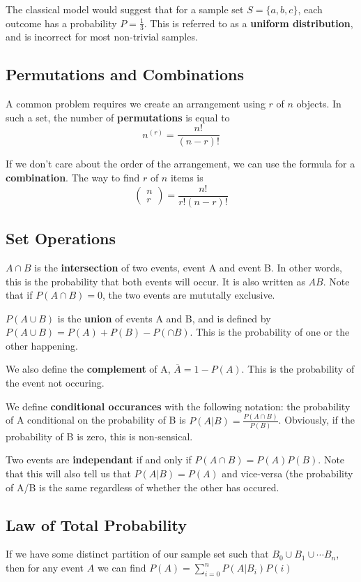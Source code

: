 \documentclass[12pt]{article}
\begin{document}
The classical model would suggest that for a sample set $S = \{ a, b, c \}$, each outcome has a probability $P = \frac{1}{3}$. This is referred to as a {\bf uniform distribution}, and is incorrect for most non-trivial samples.

\subsection*{Permutations and Combinations}
A common problem requires we create an arrangement using $r$ of $n$ objects. In such a set, the number of {\bf permutations} is equal to \[ n^{(r)} = \frac{n!}{(n-r)!} \]

If we don't care about the order of the arrangement, we can use the formula for a {\bf combination}. The way to find $r$ of $n$ items is \[ \begin{pmatrix}n\\r\end{pmatrix} = \frac{n!}{r!(n-r)!} \]

\subsection*{Set Operations}
$A \cap B$ is the {\bf intersection} of two events, event A and event B. In other words, this is the probability that both events will occur. It is also written as $AB$. Note that if $P(A \cap B) = 0$, the two events are mututally exclusive.

$P(A \cup B)$ is the {\bf union} of events A and B, and is defined by $P(A \cup B) = P(A) + P(B) - P( \cap B)$. This is the probability of one or the other happening.

We also define the {\bf complement} of A, $\overline{A} = 1 - P(A)$. This is the probability of the event not occuring.

We define {\bf conditional occurances} with the following notation: the probability of A conditional on the probability of B is $P(A|B) = \frac{P(A \cap B)}{P(B)}$. Obviously, if the probability of B is zero, this is non-sensical.

Two events are {\bf independant} if and only if $P(A \cap B) = P(A) P(B)$. Note that this will also tell us that $P(A|B) = P(A)$ and vice-versa (the probability of A/B is the same regardless of whether the other has occured.

\subsection*{Law of Total Probability}
If we have some distinct partition of our sample set such that $B_0 \cup B_1 \cup \cdots B_n$, then for any event $A$ we can find $P(A) = \displaystyle\sum_{i=0}^n P(A|B_i)P(i)$
\end{document}
